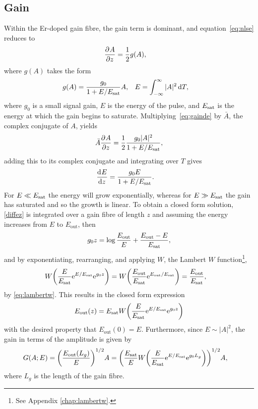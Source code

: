 \subsection{Gain}
\label{chap:gain}
Within the Er-doped gain fibre, the gain term is dominant, and equation~\eqref{eq:nlse} reduces to
\begin{align}
\label{eq:gainde}
\frac{\partial^{}A}{\partial{z}^{}} &= \frac{1}{2} g(A),
\end{align}
where $g(A)$ takes the form \cite{bohun, burgoyne2014, hausbook, haus1975, haus1991, haus1992, haus2000, kartner, peng, shtyrina, silfvast, usechak, yarutkina}
\begin{align}
\label{eq:energy}
	g(A) &= \frac{g_0}{1 + E / E_{\textrm{sat}}} A,& E &= \int_{-\infty}^\infty |A|^2 \, \textrm{d} T,
\end{align}
where $g_0$ is a small signal gain, $E$ is the energy of the pulse, and $E_{\textrm{sat}}$ is the energy at which the gain begins to saturate.
Multiplying~\eqref{eq:gainde} by $\bar{A}$, the complex conjugate of $A$, yields
\begin{align*}
	\bar{A} \frac{\partial^{}A}{\partial{z}^{}} = \frac{1}{2}\frac{g_0 |A|^2}{1 + E / E_{\textrm{sat}}},
\end{align*}
adding this to its complex conjugate and integrating over $T$ gives
\begin{align}
\label{diffez}
	\frac{\textrm{d}^{}E}{\textrm{d}{z}^{}} &= \frac{g_0 E}{1 + E / E_{\textrm{sat}}}.
\end{align}
For $E \ll E_{\textrm{sat}}$ the energy will grow exponentially, whereas for $E \gg E_{\textrm{sat}}$ the gain has saturated and so the growth is linear. To obtain a closed form solution, \eqref{diffez} is integrated over a gain fibre of length $z$ and assuming the energy increases from $E$ to $E_{\textrm{out}}$, then
\begin{align*}
	g_0 z = \log\frac{E_{\textrm{out}}}{E} + \frac{E_{\textrm{out}}-E}{E_{\textrm{sat}}},
\end{align*}
and by exponentiating, rearranging, and applying $W$, the Lambert $W$ function\footnote{See Appendix \ref{chap:lambertw}.},
\begin{align*}
W \left(\frac{E}{\Es} \textrm{e}^{E/\Es} \textrm{e}^{g_0 z}\right) &= W\left(\frac{E_{\textrm{out}}}{\Es} \textrm{e}^{E_{\textrm{out}}/\Es}\right) = \frac{E_{\textrm{out}}}{\Es},
\end{align*}
by \eqref{eq:lambertw}. This results in the closed form expression
\begin{align*}
E_{\textrm{out}}(z) = \Es W \left( \frac{E}{\Es} \textrm{e}^{E/\Es} \textrm{e}^{g_0 z} \right)
\end{align*}
with the desired property that $E_{\textrm{out}}(0)=E$. Furthermore, since $E \sim |A|^2$, the gain in terms of the amplitude is given by
\begin{align*}
G(A;E) &= \left(\frac{E_{\textrm{out}}(L_g)}{E}\right)^{1/2}A = \left( \frac{\Es}{E} W \left( \frac{E}{\Es} \textrm{e}^{E/\Es} \textrm{e}^{g_0 L_g} \right) \right)^{1/2} A,
\end{align*}
where $L_g$ is the length of the gain fibre.

